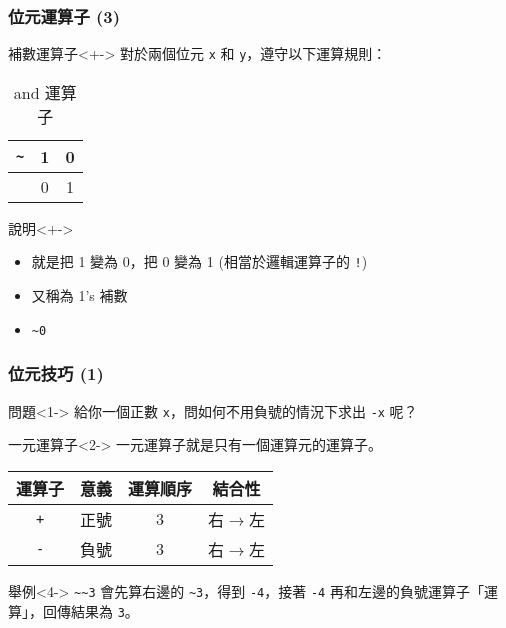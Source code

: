 \documentclass[utf8]{beamer}
\begin{document}
\begin{CJK}{UTF8}{bkai}
\begin{frame}[fragile]
  \frametitle{位元運算子 (3)}
  \begin{block}{補數運算子}<+->
    對於兩個位元 \lstinline{x}{} 和 \lstinline{y}{}，遵守以下運算規則：
    \begin{table}[h]
      \begin{tabular}{|c||c|c|}
      \hline
      \lstinline{~}{} & \alert{1} & \alert{0}\\
      \hline
                      & 0         & 1\\
      \hline
      \end{tabular}
      \caption{and 運算子}
    \end{table}
  \end{block}
  \begin{exampleblock}{說明}<+->
    \begin{itemize}
    \item 就是把 1 變為 0，把 0 變為 1 (相當於邏輯運算子的 \lstinline{!}{})
    \item<+-> 又稱為 1's 補數
    \item<+-> \lstinline{~0}{}
    \end{itemize}
  \end{exampleblock}
\end{frame}

\begin{frame}[fragile]
  \frametitle{位元技巧 (1)}
  \begin{alertblock}{問題}<1->
  給你一個正數 \lstinline{x}{}，問如何不用負號的情況下求出 \lstinline{-x}{} 呢？
  \end{alertblock}
  \begin{block}{一元運算子}<2->
    \alert{一元運算子}就是只有一個運算元的運算子。
    \pause \pause
    \begin{table}[h]
      \begin{tabular}{|c|c|c|c|}
      \hline
      運算子           & 意義 & 運算順序 & 結合性\\
      \hline
      \lstinline{+}{} & 正號 & 3      & \alert{右$\rightarrow$左}\\
      \hline
      \lstinline{-}{} & 負號 & 3      & \alert{右$\rightarrow$左}\\
      \hline
      \end{tabular}
    \end{table}
  \end{block}
  \begin{exampleblock}{舉例}<4->
  \lstinline{~~3}{} 會先算右邊的 \lstinline{~3}{}，得到 \lstinline{-4}{}，接著 \lstinline{-4}{} 再和左邊的負號運算子「運算」，回傳結果為 \lstinline{3}{}。
  \end{exampleblock}
\end{frame}


\end{CJK}
\end{document}
